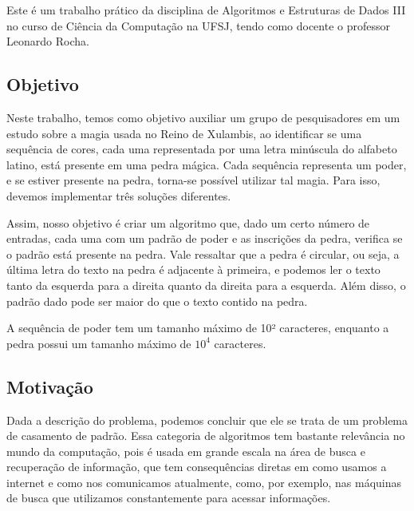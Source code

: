\documentclass[12pt]{article}
\begin{document}
        Este é um trabalho prático da disciplina de Algoritmos e Estruturas de Dados III no curso 
        de Ciência da Computação na UFSJ, tendo como docente o professor Leonardo Rocha.
            
        \subsection{Objetivo}
            Neste trabalho, temos como objetivo auxiliar um grupo de pesquisadores em um estudo 
            sobre a magia usada no Reino de Xulambis, ao identificar se uma sequência de cores, 
            cada uma representada por uma letra minúscula do alfabeto latino, está presente em 
            uma pedra mágica. Cada sequência representa um poder, e se estiver presente na pedra, 
            torna-se possível utilizar tal magia. Para isso, devemos implementar três soluções 
            diferentes.

            Assim, nosso objetivo é criar um algoritmo que, dado um certo número de entradas, 
            cada uma com um padrão de poder e as inscrições da pedra, verifica se o padrão está 
            presente na pedra. Vale ressaltar que a pedra é circular, ou seja, a última letra do 
            texto na pedra é adjacente à primeira, e podemos ler o texto tanto da esquerda para a 
            direita quanto da direita para a esquerda. Além disso, o padrão dado pode ser maior 
            do que o texto contido na pedra.

            A sequência de poder tem um tamanho máximo de 10² caracteres, enquanto a pedra possui 
            um tamanho máximo de \(10^4\) caracteres.
        
        \subsection{Motivação}
            Dada a descrição do problema, podemos concluir que ele se trata de um problema de 
            casamento de padrão. Essa categoria de algoritmos tem bastante relevância no mundo da 
            computação, pois é usada em grande escala na área de busca e recuperação de informação, 
            que tem consequências diretas em como usamos a internet e como nos comunicamos atualmente, 
            como, por exemplo, nas máquinas de busca que utilizamos constantemente para acessar 
            informações.
     
\end{document}
